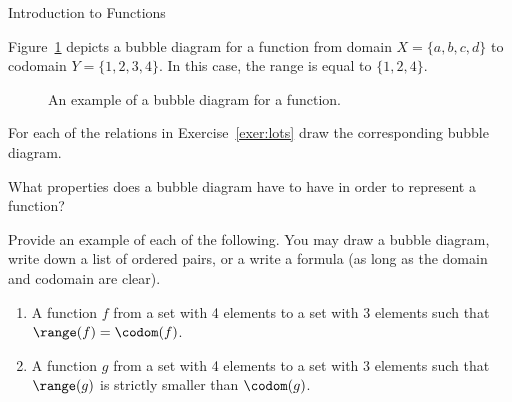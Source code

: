 \begin{section}{Introduction to Functions}
\begin{example}
Figure~\ref{fig:bubble} depicts a bubble diagram for a function from domain $X=\{a,b,c,d\}$ to codomain $Y=\{1,2,3,4\}$. In this case, the range is equal to $\{1,2,4\}$.
\end{example} 

\begin{figure}
\centering
{}
\caption{An example of a bubble diagram for a function.}\label{fig:bubble}
\end{figure}

\begin{exercise}
For each of the relations in Exercise~\ref{exer:lots} draw the corresponding bubble diagram.
\end{exercise}

\begin{problem}
What properties does a bubble diagram have to have in order to represent a function?
\end{problem}

\begin{exercise}
Provide an example of each of the following.  You may draw a bubble diagram, write down a list of ordered pairs, or a write a formula (as long as the domain and codomain are clear).
\begin{enumerate}[label=\textrm{(\alph*)}]
\item A function $f$ from a set with 4 elements to a set with 3 elements such that $\range(f)=\codom(f)$.
\item A function $g$ from a set with 4 elements to a set with 3 elements such that $\range(g)$ is strictly smaller than $\codom(g)$.
\end{enumerate}
\end{exercise}


\end{section}
